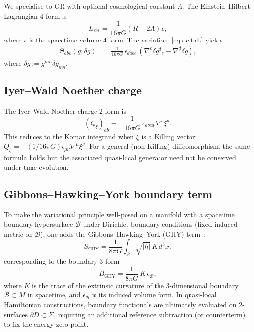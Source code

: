 \documentclass[12pt,a4paper]{article}
\newcommand{\Sig}{\Sigma}           %
\newcommand{\pa}{\partial}          %
\newcommand{\Qxi}{Q_\xi}
\begin{document}
We specialise to GR with optional cosmological constant
$\Lambda$. The Einstein--Hilbert Lagrangian 4-form is
\begin{equation}
  L_{\mathrm{EH}} = \frac{1}{16\pi G}(R - 2\Lambda)\,\epsilon,
  \label{eq:LEH}
\end{equation}
where $\epsilon$ is the spacetime volume 4-form. The
variation~\eqref{eq:deltaL} yields
\begin{align}
  \Theta_{abc}(g;\delta g)
  &= \frac{1}{16\pi G}\,\epsilon_{dabc}\,
  (\nabla^e\delta g^{d}{}_{e} - \nabla^d \delta g),
  \label{eq:theta}
\end{align}
where $\delta g := g^{mn}\delta g_{mn}$.

\subsection{Iyer--Wald Noether charge}

The Iyer--Wald Noether charge 2-form is~\cite{IyerWald1994}
\begin{equation}
  (\Qxi)_{ab} = -\frac{1}{16\pi G}\,\epsilon_{abcd}\,\nabla^c\xi^d.
  \label{eq:Qxi}
\end{equation}
This reduces to the Komar integrand when $\xi$ is a Killing
vector: $\Qxi = -(1/16\pi G)\epsilon_{\mu\nu}\nabla^\mu
\xi^\nu$. For a general (non-Killing) diffeomorphism, the
same formula holds but the associated quasi-local generator
need not be conserved under time evolution.

\subsection{Gibbons--Hawking--York boundary term}

To make the variational principle well-posed on a
manifold with a spacetime boundary hypersurface
$\mathcal{B}$ under Dirichlet boundary conditions
(fixed induced metric on $\mathcal{B}$), one adds the
Gibbons--Hawking--York
(GHY) term~\cite{GibbonsHawking1977,York1972}:
\begin{equation}
  S_{\mathrm{GHY}} = \frac{1}{8\pi G}\int_{\mathcal{B}}
  \sqrt{|h|}\,K\,d^3x,
  \label{eq:SGHY}
\end{equation}
corresponding to the boundary 3-form
\begin{equation}
  B_{\mathrm{GHY}} = \frac{1}{8\pi G}\,K\,\epsilon_{\mathcal{B}},
  \label{eq:BGHY}
\end{equation}
where $K$ is the trace of the extrinsic curvature of the
3-dimensional boundary $\mathcal{B}\subset M$ in spacetime,
and $\epsilon_{\mathcal{B}}$ is its induced volume form. In
quasi-local Hamiltonian constructions, boundary functionals
are ultimately evaluated on 2-surfaces $\pa D\subset\Sig$,
requiring an additional reference subtraction (or
counterterm) to fix the energy zero-point.
\end{document}

